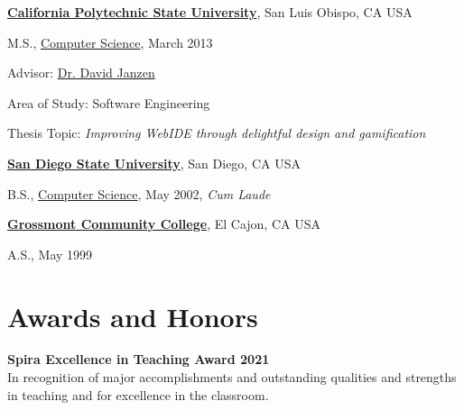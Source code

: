 \documentclass[10pt]{article}
\begin{document}
        
\href{http://www.calpoly.edu/}{\textbf{California Polytechnic State University}},
San Luis Obispo, CA USA

\begin{outerlist}

\item[] M.S.,
		\vspace{-.2\baselineskip}
        \href{https://www.csc.calpoly.edu/}
             {Computer Science}, March 2013
              \begin{innerlist}
             \item Advisor:
              \href{https://users.csc.calpoly.edu/~djanzen/}
                   {Dr. David Janzen} 
        \item Area of Study: Software Engineering 
        \item Thesis Topic: \emph{Improving WebIDE through delightful design and gamification}
        \end{innerlist}
              
\end{outerlist}
\vspace{.5\baselineskip}

\href{https://www.sdsu.edu/}{\textbf{San Diego State University}},
San Diego, CA USA
\begin{outerlist}

\item[] B.S.,
        \href{https://www.cs.sdsu.edu/}
             {Computer Science}, May 2002, \emph{Cum Laude}
\end{outerlist}
\vspace{.5\baselineskip}


\href{http://www.grossmont.edu/}{\textbf{Grossmont Community College}},
El Cajon, CA USA

\begin{outerlist}

\item[] A.S.,
             May 1999
\end{outerlist}

\section{Awards and Honors}

\textbf{Spira Excellence in Teaching Award 2021}\\
In recognition of major accomplishments and outstanding qualities and strengths in teaching and for excellence in the classroom. 
\end{document}
